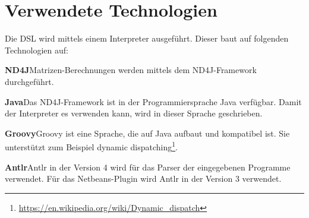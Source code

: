 \section{Verwendete Technologien}
Die \ac{DSL} wird mittels einem Interpreter ausgeführt.
Dieser baut auf folgenden Technologien auf:
\begin{description}
	\item{\textbf{ND4J}}\newline Matrizen-Berechnungen werden mittels dem ND4J-Framework durchgeführt.
	\item{\textbf{Java}}\newline Das ND4J-Framework ist in der Programmiersprache Java verfügbar. Damit der Interpreter es verwenden kann, wird in dieser Sprache geschrieben.
	\item{\textbf{Groovy}}\newline Groovy ist eine Sprache, die auf Java aufbaut und kompatibel ist. Sie unterstützt zum Beispiel dynamic dispatching\footnote{\url{https://en.wikipedia.org/wiki/Dynamic_dispatch}}.
	\item{\textbf{Antlr}}\newline Antlr in der Version 4 wird für das Parser der eingegebenen Programme verwendet. Für das Netbeans-Plugin wird Antlr in der Version 3 verwendet.
\end{description}

\endinput
